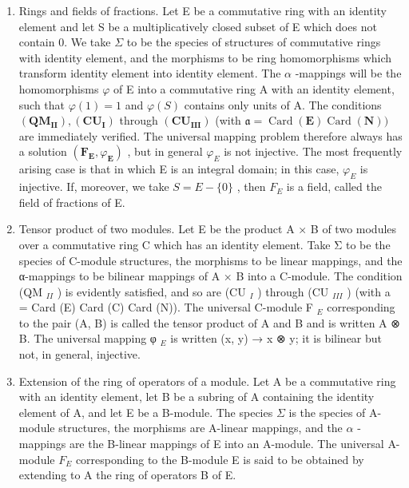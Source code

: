 \begin{enumerate}
\def\labelenumi{\Roman{enumi}.}
\setcounter{enumi}{1}
\item
  Rings and fields of fractions. Let E be a commutative ring with an identity element and let S be a multiplicatively closed subset of E which does not contain 0. We take \(\Sigma\) to be the species of structures of commutative rings with identity element, and the morphisms to be ring homomorphisms which transform identity element into identity element. The \(\alpha\) -mappings will be the homomorphisms \(\varphi\) of E into a commutative ring A with an identity element, such that \(\varphi(1)=1\) and \(\varphi(S)\) contains only units of A. The conditions \((\mathbf{Q}\mathbf{M}_{\mathbf{II}}), (\mathbf{C}\mathbf{U}_{\mathbf{I}})\) through \((\mathbf{C}\mathbf{U}_{\mathbf{III}})\) (with \(\mathfrak{a}=\operatorname{Card}(\mathbf{E})\operatorname{Card}(\mathbf{N}))\) are immediately verified. The universal mapping problem therefore always has a solution \((\mathbf{F}_{\mathbf{E}},\varphi_{\mathbf{E}})\) , but in general \(\varphi_{E}\) is not injective. The most frequently arising case is that in which E is an integral domain; in this case, \(\varphi_{E}\) is injective. If, moreover, we take \(S = E - \{0\}\) , then \(F_{E}\) is a field, called the field of fractions of E.
\item
  Tensor product of two modules. Let E be the product A × B of two modules over a commutative ring C which has an identity element. Take Σ to be the species of C-module structures, the morphisms to be linear mappings, and the α-mappings to be bilinear mappings of A × B into a C-module. The condition (QM \(_{II}\) ) is evidently satisfied, and so are (CU \(_{I}\) ) through (CU \(_{III}\) ) (with a = Card (E) Card (C) Card (N)). The universal C-module F \(_{E}\) corresponding to the pair (A, B) is called the tensor product of A and B and is written A ⊗ B. The universal mapping φ \(_{E}\) is written (x, y) → x ⊗ y; it is bilinear but not, in general, injective.
\item
  Extension of the ring of operators of a module. Let A be a commutative ring with an identity element, let B be a subring of A containing the identity element of A, and let E be a B-module. The species \(\Sigma\) is the species of A-module structures, the morphisms are A-linear mappings, and the \(\alpha\) -mappings are the B-linear mappings of E into an A-module. The universal A-module \(F_{E}\) corresponding to the B-module E is said to be obtained by extending to A the ring of operators B of E.
\end{enumerate}

